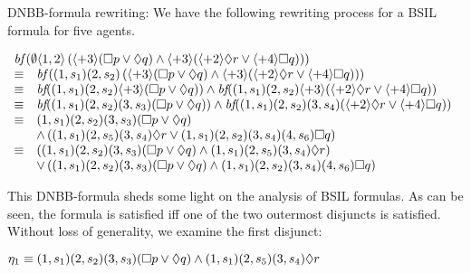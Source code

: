 {\example \label{exmp.dn-bbf} DNBB-formula rewriting:}
We have the following rewriting process for a BSIL formula for five agents.
\begin{center}
$\begin{array}{ll}
\multicolumn{2}{l}{
  \embf\left(\emptyset\langle 1,2\rangle\left( 
    	\langle+3\rangle(\pfrr p\vee \pevt q
    	) 
  \wedge \langle+3\rangle(\langle+2\rangle \pevt r
	\vee \langle+ 4\rangle\pfrr q)
  \right) \right) }\\ 

\equiv	&  
\embf\left((1,s_1)(2,s_2)\left( 
    	\langle+3\rangle(\pfrr p\vee \pevt q
    	) 
  \wedge \langle+3\rangle(\langle+2\rangle \pevt r\vee \langle+ 4\rangle\pfrr q)
  \right)\right)\\ 

\equiv & %
\embf((1, s_1)(2,s_2)\langle+3\rangle(\pfrr p\vee \pevt q)) %
\wedge %
  \embf((1,s_1)(2,s_2)\langle+3\rangle(
    \langle+2\rangle \pevt r\vee \langle+ 4\rangle\pfrr q
  ))
\\ 
\equiv & \embf((1, s_1)(2,s_2)(3,s_3)(
	    \pfrr p\vee \pevt q
	    )) 
	\wedge  
	  \embf((1,s_1)(2,s_2)(3,s_4)
	    (\langle+ 2\rangle \pevt r\vee \langle+ 4\rangle\pfrr q))
	\\ 
\equiv & (1,s_1)(2,s_2)(3,s_3)(
	    \pfrr p\vee \pevt q
	    )\\ 
	& \wedge \left(
	  (1,s_1)(2,s_5)(3,s_4)
	    \pevt r
	  \vee 
	  (1,s_1)(2,s_2)(3,s_4)(4,s_6)
	     \pfrr q\right)
	\\ 
\equiv & \left((1,s_1)(2,s_2)(3,s_3)(
	    \pfrr p\vee \pevt q
	    )\wedge (1,s_1)(2,s_5)(3,s_4)
	    \pevt r\right)\\ 
	& \vee \left((1,s_1)(2,s_2)(3,s_3)(
	    \pfrr p\vee \pevt q
	    )\wedge  
	  (1,s_1)(2,s_2)(3,s_4)(4,s_6)
	     \pfrr q\right)
	\\ 
\end{array}$
\end{center} 
This DNBB-formula sheds some light on the analysis of BSIL formulas.
As can be seen,
the formula is satisfied iff one of the two 
outermost disjuncts is satisfied.
Without loss of generality, we examine the first disjunct: 
\begin{center}
$\eta_1\equiv (1,s_1)(2,s_2)(3,s_3)(
	    \pfrr p\vee \pevt q
	    )\wedge (1,s_1)(2,s_5)(3,s_4)
	    \pevt r$
\end{center}
